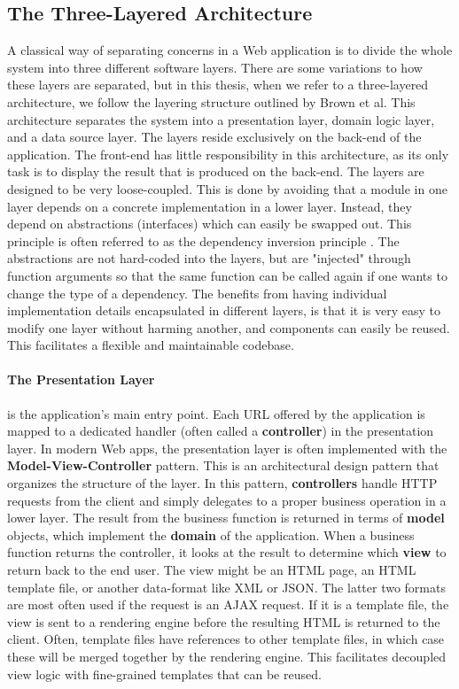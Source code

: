 \subsection{The Three-Layered Architecture}		
A classical way of separating concerns in a Web application is to divide the whole system into three different software layers. There are some variations to how these layers are separated, but in this thesis, when we refer to a three-layered architecture, we follow the layering structure outlined by Brown et al\cite{brown}. This architecture separates the system into a presentation layer, domain logic layer, and a data source layer. The layers reside exclusively on the back-end of the application. The front-end has little responsibility in this architecture, as its only task is to display the result that is produced on the back-end. The layers are designed to be very loose-coupled. This is done by avoiding that a module in one layer depends on a concrete implementation in a lower layer. Instead, they depend on abstractions (interfaces) which can easily be swapped out. This principle is often referred to as the dependency inversion principle \cite{dipioc}. The abstractions are not hard-coded into the layers, but are "injected" through function arguments so that the same function can be called again if one wants to change the type of a dependency. The benefits from having individual implementation details encapsulated in different layers, is that it is very easy to modify one layer without harming another, and components can easily be reused. This facilitates a flexible and maintainable codebase\cite{flexible}.
		
\paragraph{The Presentation Layer} is the application's main entry point. Each URL offered by the application is mapped to a dedicated handler (often called a \textbf{controller}) in the presentation layer. In modern Web apps, the presentation layer is often implemented with the \textbf{Model-View-Controller} pattern\cite{mvc}. This is an architectural design pattern that organizes the structure of the layer. In this pattern, \textbf{controllers} handle HTTP requests from the client and simply delegates to a proper business operation in a lower layer. The result from the business function is returned in terms of \textbf{model} objects, which implement the \textbf{domain} of the application. When a business function returns the controller, it looks at the result to determine which \textbf{view} to return back to the end user. The view might be an HTML page, an HTML template file, or another data-format like XML or JSON. The latter two formats are most often used if the request is an AJAX request. If it is a template file, the view is sent to a rendering engine before the resulting HTML is returned to the client. Often, template files have references to other template files, in which case these will be merged together by the rendering engine. This facilitates decoupled view logic with fine-grained templates that can be reused.

